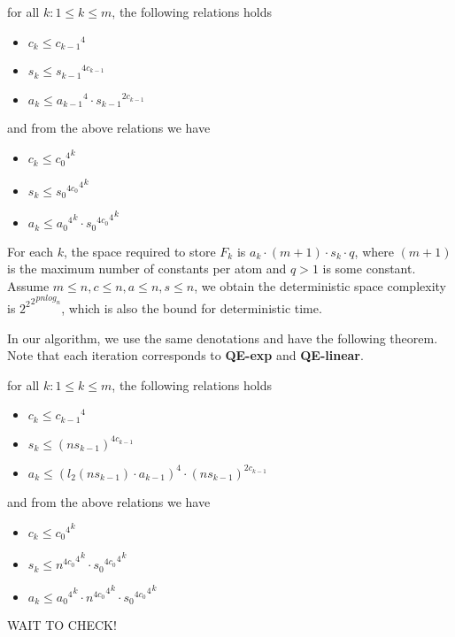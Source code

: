 \begin{theorem}
for all $k: 1\le k\le m$, the following relations holds
\begin{itemize}
    \item $c_k \le {c_{k-1}}^4$
    \item $s_k \le {s_{k-1}}^{4c_{k-1}}$
    \item $a_k \le {a_{k-1}}^4 \cdot {s_{k-1}}^{2c_{k-1}}$
\end{itemize}
and from the above relations we have 
\begin{itemize}
    \item $c_k \le {{c_0}^4}^k$
    \item $s_k \le {{{s_0}^{4c_0}}^4}^k$
    \item $a_k \le {{a_0}^4}^k \cdot {{{s_0}^{4c_0}}^4}^k$
\end{itemize}
\end{theorem}

For each $k$,
the space required to store $F_k$ 
is $a_k \cdot (m+1) \cdot s_k \cdot q$,
where $(m+1)$ is the maximum number of constants per atom and $q>1$ is some constant. Assume $m\le n, c\le n, a\le n, s\le n$, we obtain the deterministic space complexity is ${{2^2}^2}^{p n log_n}$, which is also the bound for deterministic time.

In our algorithm,
we use the same denotations and have the following theorem. 
Note that each iteration corresponds to \textbf{QE-exp} and \textbf{QE-linear}.
\begin{theorem}
for all $k: 1\le k\le m$, the following relations holds
\begin{itemize}
    \item $c_k \le {c_{k-1}}^4$
    \item $s_k \le {(n s_{k-1})}^{4c_{k-1}}$
    \item $a_k \le {{(l_2(ns_{k-1})\cdot a_{k-1})}}^4 \cdot {(n s_{k-1})}^{2c_{k-1}}$
\end{itemize}
and from the above relations we have 
\begin{itemize}
    \item $c_k \le {{c_0}^4}^k$
    \item $s_k \le {{{n}^{4c_0}}^4}^k \cdot {{{s_0}^{4c_0}}^4}^k$
    \item $a_k \le {{a_0}^4}^k \cdot 
     {{{n}^{4c_0}}^4}^k
     \cdot {{{s_0}^{4c_0}}^4}^k$
\end{itemize}
\end{theorem}

WAIT TO CHECK!

